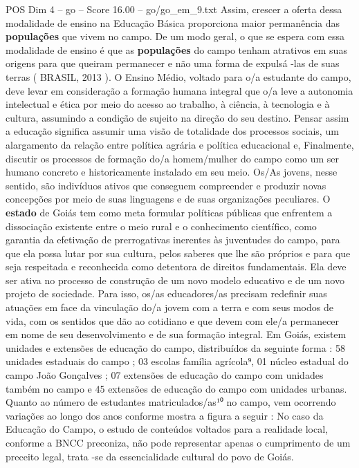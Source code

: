 \begin{textsample}{POS Dim 4 – go – Score 16.00 – go/go\_em\_9.txt}
Assim, crescer a oferta dessa modalidade de ensino na Educação Básica proporciona maior permanência das \textbf{populações} que vivem no campo.
De um modo geral, o que se espera com essa modalidade de ensino é que as \textbf{populações} do campo tenham atrativos em suas origens para que queiram permanecer e não uma forma de expulsá -las de suas terras ( BRASIL, 2013 ).
O Ensino Médio, voltado para o/a estudante do campo, deve levar em consideração a formação humana integral que o/a leve a autonomia intelectual e ética por meio do acesso ao trabalho, à ciência, à tecnologia e à cultura, assumindo a condição de sujeito na direção do seu destino.
Pensar assim a educação significa assumir uma visão de totalidade dos processos sociais, um alargamento da relação entre política agrária e política educacional e, Finalmente, discutir os processos de formação do/a homem/mulher do campo como um ser humano concreto e historicamente instalado em seu meio.
Os/As jovens, nesse sentido, são indivíduos ativos que conseguem compreender e produzir novas concepções por meio de suas linguagens e de suas organizações peculiares.
O \textbf{estado} de Goiás tem como meta formular políticas públicas que enfrentem a dissociação existente entre o meio rural e o conhecimento científico, como garantia da efetivação de prerrogativas inerentes às juventudes do campo, para que ela possa lutar por sua cultura, pelos saberes que lhe são próprios e para que seja respeitada e reconhecida como detentora de direitos fundamentais.
Ela deve ser ativa no processo de construção de um novo modelo educativo e de um novo projeto de sociedade.
Para isso, os/as educadores/as precisam redefinir suas atuações em face da vinculação do/a jovem com a terra e com seus modos de vida, com os sentidos que dão ao cotidiano e que devem com ele/a permanecer em nome de seu desenvolvimento e de sua formação integral.
Em Goiás, existem unidades e extensões de educação do campo, distribuídos da seguinte forma : 58 unidades estaduais do campo ; 03 escolas família agrícola⁹, 01 núcleo estadual do campo João Gonçalves ; 07 extensões de educação do campo com unidades também no campo e 45 extensões de educação do campo com unidades urbanas.
Quanto ao número de estudantes matriculados/as¹⁰ no campo, vem ocorrendo variações ao longo dos anos conforme mostra a figura a seguir : No caso da Educação do Campo, o estudo de conteúdos voltados para a realidade local, conforme a BNCC preconiza, não pode representar apenas o cumprimento de um preceito legal, trata -se da essencialidade cultural do povo de Goiás.

\end{textsample}
